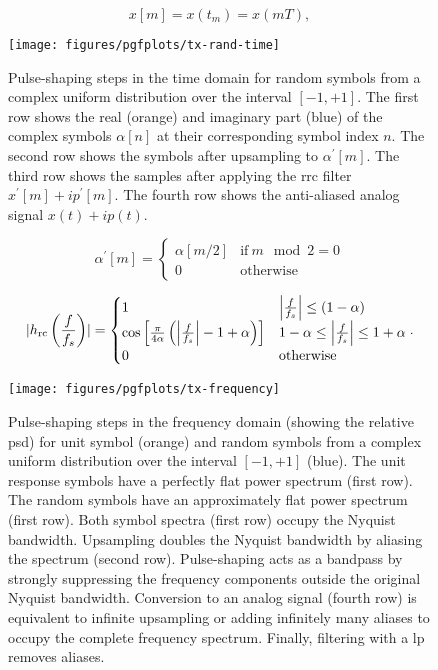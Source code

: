 \begin{equation}
	x[m]
	=
	x(t_m)
	=
	x(mT)
	,
\end{equation}

\begin{figure}[htb]
	\centering
	\texttt{[image: figures/pgfplots/tx-rand-time]}
	\caption{Pulse-shaping steps in the time domain for random symbols from a complex uniform distribution over the interval $[-1,+1]$. The first row shows the real (orange) and imaginary part (blue) of the complex symbols $\alpha[n]$ at their corresponding symbol index $n$. The second row shows the symbols after upsampling to $\alpha^\prime[m]$. The third row shows the samples after applying the \gls{rrc} filter $x^\prime[m]+ip^\prime[m]$. The fourth row shows the anti-aliased analog signal $x(t)+ip(t)$.}\label{fig:pulse_shaping_rand_time}
\end{figure}

\begin{equation}
	\alpha^\prime[m]
	=
	\begin{cases}
		\alpha[m/2] & \text{if}\ m\mod2=0 \\
		0 & \text{otherwise}
	\end{cases}
\end{equation}

\begin{equation}
	\abs{h_\text{rc}\left(\frac{f}{f_s}\right)}
	=
	\begin{cases}
		1 & \abs*{\frac{f}{f_s}}\leq(1-\alpha) \\
		\cos\left[\frac{\pi}{4\alpha}\left(\abs*{\frac{f}{f_s}}-1+\alpha\right)\right] & 1-\alpha\leq\abs*{\frac{f}{f_s}}\leq1+\alpha \\
		0 & \text{otherwise}
	\end{cases}
	.
\end{equation}

\begin{figure}[htb]
	\centering
	\texttt{[image: figures/pgfplots/tx-frequency]}
	\caption{Pulse-shaping steps in the frequency domain (showing the relative \gls{psd}) for unit symbol (orange) and random symbols from a complex uniform distribution over the interval $[-1,+1]$ (blue). The unit response symbols have a perfectly flat power spectrum (first row). The random symbols have an approximately flat power spectrum (first row). Both symbol spectra (first row) occupy the Nyquist bandwidth. Upsampling doubles the Nyquist bandwidth by aliasing the spectrum (second row). Pulse-shaping acts as a bandpass by strongly suppressing the frequency components outside the original Nyquist bandwidth. Conversion to an analog signal (fourth row) is equivalent to infinite upsampling or adding infinitely many aliases to occupy the complete frequency spectrum. Finally, filtering with a \gls{lp} removes aliases.}\label{fig:pulse_shaping_freq}
\end{figure}

